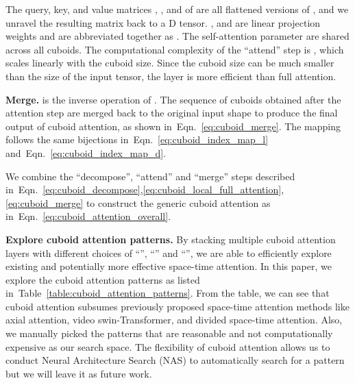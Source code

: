 \documentclass{article}
\newcommand{\tabref}[1]{Table~\ref{#1}}
\newcommand{\eqnref}[1]{Eqn.~\ref{#1}}
\renewcommand{\paragraph}[1]{\textbf{#1. }}
\begin{document}
The query, key, and value matrices , , and  of  are all flattened versions of , and we unravel the resulting matrix back to a D tensor. ,  and  are linear projection weights and are abbreviated together as .
The self-attention parameter  are shared across all cuboids. 
The computational complexity of the ``attend'' step is , which scales linearly with the cuboid size. Since the cuboid size can be much smaller than the size of the input tensor, the layer is more efficient than full attention.

\paragraph{Merge}
 is the inverse operation of . The sequence of cuboids obtained after the attention step  are merged back to the original input shape to produce the final output of cuboid attention, as shown in~\eqnref{eq:cuboid_merge}. The mapping follows the same bijections in~\eqnref{eq:cuboid_index_map_l} and~\eqnref{eq:cuboid_index_map_d}.

We combine the ``decompose'', ``attend'' and ``merge'' steps described in~\eqnref{eq:cuboid_decompose},\ref{eq:cuboid_local_full_attention},\ref{eq:cuboid_merge} to construct the generic cuboid attention as in~\eqnref{eq:cuboid_attention_overall}.


\paragraph{Explore cuboid attention patterns} 
By stacking multiple cuboid attention layers with different choices of ``'', ``'' and ``'', we are able to efficiently explore existing and potentially more effective space-time attention. In this paper, we explore the cuboid attention patterns as listed in~\tabref{table:cuboid_attention_patterns}. From the table, we can see that cuboid attention  subsumes previously proposed space-time attention methods like axial attention, video swin-Transformer, and divided space-time attention. Also, we manually picked the patterns that are reasonable and not computationally expensive as our search space. The flexibility of cuboid attention allows us to conduct Neural Architecture Search (NAS) to automatically search for a pattern but we will leave it as future work.
\end{document}
